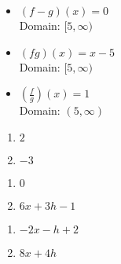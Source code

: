 \begin{enumerate}
\begin{multicols}{2}
\begin{itemize}
      \vfill
      
      \columnbreak
      
\item $(f-g)(x) =0$ \\
       Domain: $[5,\infty)$


\end{itemize}

\end{multicols}

\begin{multicols}{2}

\begin{itemize}

\item $(fg)(x) =x-5$ \\
       Domain: $[5,\infty)$
      
      \vfill
      
      \columnbreak
      
\item $\left(\frac{f}{g}\right)(x) =1$ \\
       Domain: $(5,\infty)$


\end{itemize}

\end{multicols}

\setcounter{HW}{\value{enumi}}
\end{enumerate}


\begin{multicols}{2}
\begin{enumerate}
\setcounter{enumi}{\value{HW}}

\item $2$
\item $-3$

\setcounter{HW}{\value{enumi}}
\end{enumerate}
\end{multicols}

\begin{multicols}{2}
\begin{enumerate}
\setcounter{enumi}{\value{HW}}

\item $0$
\item $6x+3h-1$

\setcounter{HW}{\value{enumi}}
\end{enumerate}
\end{multicols}

\begin{multicols}{2}
\begin{enumerate}
\setcounter{enumi}{\value{HW}}

\item $-2x-h+2$
\item $8x+4h$

\setcounter{HW}{\value{enumi}}
\end{enumerate}
\end{multicols}

